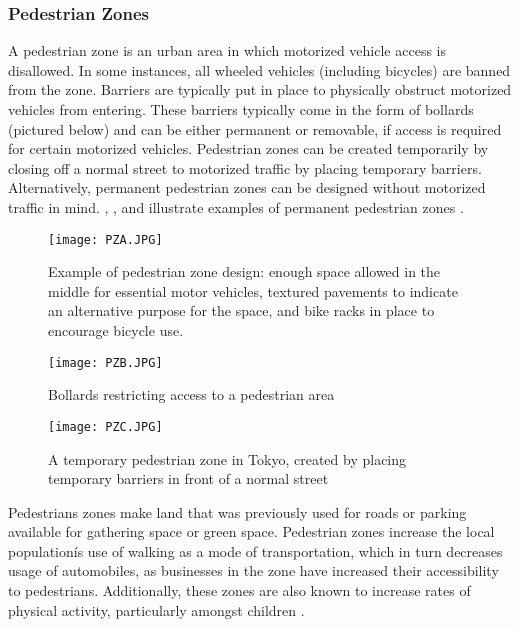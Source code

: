 \subsubsection{Pedestrian Zones}
A pedestrian zone is an urban area in which motorized vehicle access is disallowed. In some instances, all wheeled vehicles (including bicycles) are banned from the zone. Barriers are typically put in place to physically obstruct motorized vehicles from entering. These barriers typically come in the form of bollards (pictured below) and can be either permanent or removable, if access is required for certain motorized vehicles. Pedestrian zones can be created temporarily by closing off a normal street to motorized traffic by placing temporary barriers. Alternatively, permanent pedestrian zones can be designed without motorized traffic in mind. , , and  illustrate examples of permanent pedestrian zones \cite{PZ4}.
 
\begin{figure}[h]
\centering
\texttt{[image: PZA.JPG]}
\caption[Example of pedestrian zone design]{Example of pedestrian zone design: enough space allowed in the middle for essential motor vehicles, textured pavements to indicate an alternative purpose for the space, and bike racks in place to encourage bicycle use.}\label{fig:PZA}
\end{figure}

\begin{figure}[h]
\centering
\texttt{[image: PZB.JPG]}
\caption[Bollards restricting access to a pedestrian area]{Bollards restricting access to a pedestrian area}\label{fig:PZB}
\end{figure}

\begin{figure}[h]
\centering
\texttt{[image: PZC.JPG]}
\caption[A temporary pedestrian zone in Tokyo]{A temporary pedestrian zone in Tokyo, created by placing temporary barriers in front of a normal street}\label{fig:PZC}
\end{figure}

Pedestrians zones make land that was previously used for roads or parking available for gathering space or green space. Pedestrian zones increase the local populationís use of walking as a mode of transportation, which in turn decreases usage of automobiles, as businesses in the zone have increased their accessibility to pedestrians. Additionally, these zones are also known to increase rates of physical activity, particularly amongst children \cite{PZ4}.
 

